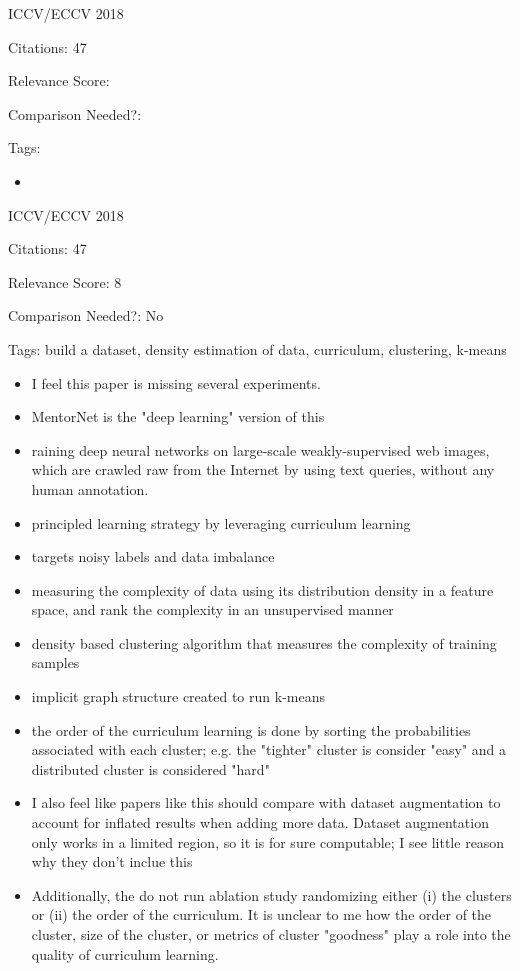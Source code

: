 \documentclass[11pt]{article}
\begin{document}
\vspace{2cm}

\noindent ICCV/ECCV 2018

\noindent Citations: 47

\noindent Relevance Score:

\noindent Comparison Needed?: 

\noindent Tags:

\begin{itemize}
\item 
\end{itemize}

\vspace{2cm}

\noindent ICCV/ECCV 2018

\noindent Citations: 47

\noindent Relevance Score: 8

\noindent Comparison Needed?: No

\noindent Tags: build a dataset, density estimation of data, curriculum, clustering, k-means

\begin{itemize}
\item I feel this paper is missing several experiments.
\item MentorNet is the "deep learning" version of this
\item raining deep neural networks on large-scale weakly-supervised web images,
which are crawled raw from the Internet by using text queries, without any human annotation.
\item principled learning strategy
by leveraging curriculum learning
\item targets noisy labels and data imbalance
\item  measuring the complexity of data using
its distribution density in a feature space, and rank the complexity in
an unsupervised manner
\item  density based
clustering algorithm that measures the complexity of training samples
\item implicit graph structure created to run k-means
\item the order of the curriculum learning is done by sorting the probabilities associated with each cluster; e.g. the "tighter" cluster is consider "easy" and a distributed cluster is considered "hard"
\item I also feel like papers like this should compare with dataset augmentation to account for inflated results when adding more data. Dataset augmentation only works in a limited region, so it is for sure computable; I see little reason why they don't inclue this
\item Additionally, the do not run ablation study randomizing either (i) the clusters or (ii) the order of the curriculum. It is unclear to me how the order of the cluster, size of the cluster, or metrics of cluster "goodness" play a role into the quality of curriculum learning.
\end{itemize}
\end{document}
